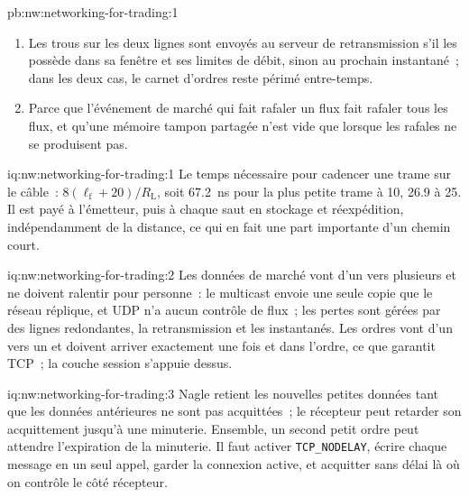 \begin{solution}{pb:nw:networking-for-trading:1}
\begin{enumerate}
\item Les trous sur les deux lignes sont envoyés au serveur de retransmission s'il les possède dans sa fenêtre et ses limites de débit, sinon au
prochain instantané~; dans les deux cas, le carnet d'ordres reste périmé entre-temps.
\item Parce que l'événement de marché qui fait rafaler un flux fait rafaler tous les flux, et qu'une mémoire tampon partagée n'est vide que lorsque les
rafales ne se produisent pas.
\end{enumerate}
\end{solution}

\begin{solution}{iq:nw:networking-for-trading:1}
Le temps nécessaire pour cadencer une trame sur le câble~: $8(\ell_{\mathrm f}+20)/R_{\mathrm L}$, soit 67.2~ns pour la plus petite trame à 10, 26.9 à
25. Il est payé à l'émetteur, puis à chaque saut en stockage et réexpédition, indépendamment de la distance, ce qui en fait une part importante
d'un chemin court.
\end{solution}

\begin{solution}{iq:nw:networking-for-trading:2}
Les données de marché vont d'un vers plusieurs et ne doivent ralentir pour personne~: le multicast envoie une seule copie que le réseau réplique, et UDP
n'a aucun contrôle de flux~; les pertes sont gérées par des lignes redondantes, la retransmission et les instantanés. Les ordres vont d'un vers un et doivent arriver
exactement une fois et dans l'ordre, ce que garantit TCP~; la couche session s'appuie dessus.
\end{solution}

\begin{solution}{iq:nw:networking-for-trading:3}
Nagle retient les nouvelles petites données tant que les données antérieures ne sont pas acquittées~; le récepteur peut retarder son acquittement jusqu'à une minuterie. Ensemble,
un second petit ordre peut attendre l'expiration de la minuterie. Il faut activer \texttt{TCP\_NODELAY}, écrire chaque message en un seul appel, garder la connexion active,
et acquitter sans délai là où on contrôle le côté récepteur.
\end{solution}

